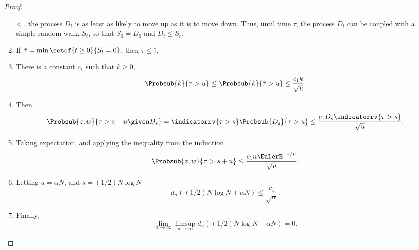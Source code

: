 \documentclass[12pt]{article}
\begin{document}
\begin{proof}
\begin{enumerate}
            < \tau \), the process \( D_t \) is as least as likely to
            move up as it is to move down.  Thus, until time \( \tau \),
            the process \( D_t \) can be coupled with a simple random
            walk, \( S_t \), so that \( S_0 = D_0 \) and \( D_t \le S_t \).
        \item
            If \( \bar{\tau} = \min\setof{t \ge 0}{S_t = 0} \), then \(
            \tau \le \bar{\tau} \).
        \item
            There is a constant \( c_1 \) such that \( k \ge 0 \),
            \[
                \Probsub{k}{\tau > u} \le \Probsub{k}{\bar{\tau} > u}
                \le \frac{c_1 k}{\sqrt{u} }.
            \]

        \item
            Then
            \[
                \Probsub{z,w}{\tau > s + u \given D_s } = \indicatorrv{\tau
                > s} \Probsub{D_s}{\tau > u} \le \frac{ c_1 D_s
                \indicatorrv{\tau > s}}{ \sqrt{u} }.
            \]
        \item
            Taking expectation, and applying the inequality from the
            induction
            \[
                \Probsub{z,w}{\tau > s + u} \le \frac{ c_1 n \EulerE^{-s/n}}
                {\sqrt{u}}.
            \]
        \item
            Letting \( u = \alpha N \), and \( s = (1/2)N \log N \)
            \[
                d_n((1/2) N \log N + \alpha N) \le \frac{c_1}{\sqrt{\alpha}}.
            \]

        \item
            Finally,
            \[
                \lim_{\alpha \to \infty} \limsup_{n \to \infty} d_n((1/2)
                N \log N + \alpha N) = 0.
            \]
    \end{enumerate}
\end{proof}

\end{document}
